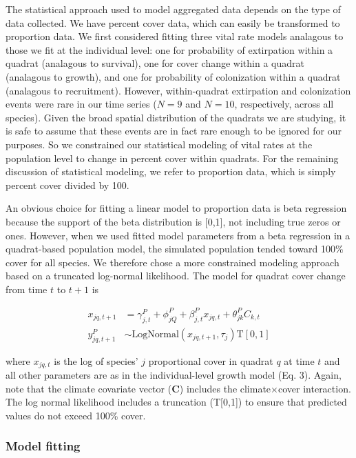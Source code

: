 \documentclass[12pt,]{article}
\begin{document}
The statistical approach used to model aggregated data depends on the
type of data collected. We have percent cover data, which can easily be
transformed to proportion data. We first considered fitting three vital
rate models analagous to those we fit at the individual level: one for
probability of extirpation within a quadrat (analagous to survival), one
for cover change within a quadrat (analagous to growth), and one for
probability of colonization within a quadrat (analagous to recruitment).
However, within-quadrat extirpation and colonization events were rare in
our time series (\(N=9\) and \(N=10\), respectively, across all
species). Given the broad spatial distribution of the quadrats we are
studying, it is safe to assume that these events are in fact rare enough
to be ignored for our purposes. So we constrained our statistical
modeling of vital rates at the population level to change in percent
cover within quadrats. For the remaining discussion of statistical
modeling, we refer to proportion data, which is simply percent cover
divided by 100.

An obvious choice for fitting a linear model to proportion data is beta
regression because the support of the beta distribution is {[}0,1{]},
not including true zeros or ones. However, when we used fitted model
parameters from a beta regression in a quadrat-based population model,
the simulated population tended toward 100\% cover for all species. We
therefore chose a more constrained modeling approach based on a
truncated log-normal likelihood. The model for quadrat cover change from
time \(t\) to \(t+1\) is

\begin{align}
x_{jq,t+1} &= \gamma^{P}_{j,t} + \phi^{P}_{jQ} + \beta^{P}_{j,t}x_{jq,t} + \theta^{P}_{jk}C_{k,t} \\
y^{P}_{jq,t+1} &\sim \text{LogNormal}(x_{jq,t+1}, \tau_{j}) \text{T}[0,1]
\end{align}

where \(x_{jq,t}\) is the log of species' \(j\) proportional cover in
quadrat \(q\) at time \(t\) and all other parameters are as in the
individual-level growth model (Eq. 3). Again, note that the climate
covariate vector (\textbf{C}) includes the climate\(\times\)cover
interaction. The log normal likelihood includes a truncation
(T{[}0,1{]}) to ensure that predicted values do not exceed 100\% cover.

\subsubsection{Model fitting}\label{model-fitting}
\end{document}
